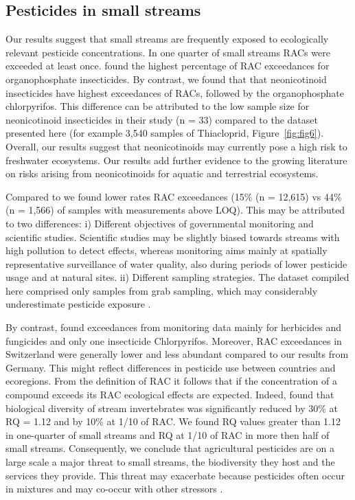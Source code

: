\documentclass[journal=esthag,manuscript=article]{achemso}
\begin{document}
\subsection{Pesticides in small streams}
Our results suggest that small streams are frequently exposed to ecologically relevant pesticide concentrations.
In one quarter of small streams RACs were exceeded at least once.
\citet{stehle_pesticide_2015} found the highest percentage of RAC exceedances for organophosphate insecticides. 
By contrast, we found that that neonicotinoid insecticides have highest exceedances of RACs, followed by the organophosphate chlorpyrifos. 
This difference can be attributed to the low sample size for neonicotinoid insecticides in their study (n = 33) compared to the dataset presented here (for example 3,540 samples of Thiacloprid, Figure~\ref{fig:fig6}). 
Overall, our results suggest that neonicotinoids may currently pose a high risk to freshwater ecosystems. 
Our results add further evidence to the growing literature on risks arising from neonicotinoids for aquatic \citep{morrissey2015neonicotinoid} and terrestrial \citep{pisa2015effects} ecosystems.

Compared to \citet{stehle_pesticide_2015} we found lower rates RAC exceedances (15\% (n = 12,615) vs 44\% (n = 1,566) of samples with measurements above LOQ). 
This may be attributed to two differences: i) Different objectives of governmental monitoring and scientific studies. Scientific studies may be slightly biased towards streams with high pollution to detect effects, whereas monitoring aims mainly at spatially representative surveillance of water quality, also during periods of lower pesticide usage and at natural sites. ii) Different sampling strategies. The dataset compiled here comprised only samples from grab sampling, which may considerably underestimate pesticide exposure \citep{stehle_probabilistic_2013}. 

By contrast, \citet{knauer_pesticides_2016} found exceedances from monitoring data mainly for herbicides and fungicides and only one insecticide Chlorpyrifos.
Moreover, RAC exceedances in Switzerland were generally lower and less abundant compared to our results from Germany. 
This might reflect differences in pesticide use between countries and ecoregions. 
From the definition of RAC it follows that if the concentration of a compound exceeds its RAC ecological effects are expected.
Indeed, \citet{stehle_agricultural_2015} found that biological diversity of stream invertebrates was significantly reduced by 30\% at RQ = 1.12 and by 10\% at 1/10 of RAC.
We found RQ values greater than 1.12 in one-quarter of small streams and RQ at 1/10 of RAC in more then half of small streams. 
Consequently, we conclude that agricultural pesticides are on a large scale a major threat to small streams, the biodiversity they host and the services they provide. 
This threat may exacerbate because pesticides often occur in mixtures \cite{schreiner_pesticide_2016} and may co-occur with other stressors \citep{schafer_contribution_2016}.
\end{document}
